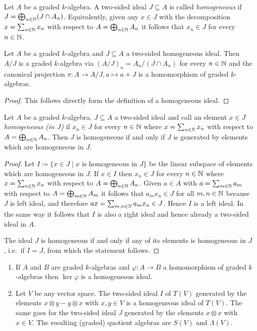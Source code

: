 \begin{defi}
 Let $A$ be a graded $k$-algebra. A two-sided ideal $J \subseteq A$ is called \emph{homogeneous} if $J = \bigoplus_{n \in \mathbb{N}} (J \cap A_n)$. Equivalently, given any $x \in J$ with the decomposition $x = \sum_{n \in \mathbb{N}} x_n$ with respect to $A = \bigoplus_{n \in \mathbb{N}} A_n$ it follows that $x_n \in J$ for every $n \in \mathbb{N}$.
\end{defi}


\begin{lem}
 Let $A$ be a graded $k$-algebra and $J \subseteq A$ a two-sided homogeneous ideal. Then $A/J$ is a graded $k$-algebra via $(A/J)_n = A_n/(J \cap A_n)$ for every $n \in \mathbb{N}$ and the canonical projection $\pi \colon A \to A/J, a \mapsto a + J$ is a homomorphism of graded $k$-algebras.
\end{lem}
\begin{proof}
 This follows directly form the definition of a homogeneous ideal.
\end{proof}


\begin{lem}
 Let $A$ be a graded $k$-algebra, $J \subseteq A$ a two-sided ideal and call an element $x \in J$ \emph{homogeneous (in $J$)} if $x_n \in J$ for every $n \in \mathbb{N}$ where $x = \sum_{n \in \mathbb{N}} x_n$ with respect to $A = \bigoplus_{n \in \mathbb{N}} A_n$. Then $J$ is homogeneous if and only if $J$ is generated by elements which are homogeneous in $J$.
\end{lem}
\begin{proof}
 Let $I \coloneqq \{x \in J \mid \text{$x$ is homogeneous in $J$}\}$ be the linear subspace of elements which are homogeneous in $J$. If $x \in I$ then $x_n \in J$ for every $n \in \mathbb{N}$ where $x = \sum_{n \in \mathbb{N}} x_n$ with respect to $A = \bigoplus_{n \in \mathbb{N}} A_n$. Given $a \in A$ with $a = \sum_{m \in \mathbb{N}} a_m$ with respect to $A = \bigoplus_{m \in \mathbb{N}} A_m$ it follows that $a_m x_n \in J$ for all $m,n \in \mathbb{N}$ because $J$ is left ideal, and therefore $ax = \sum_{m,n \in \mathbb{N}} a_m x_n \in J$. Hence $I$ is a left ideal. In the same way it follows that $I$ is also a right ideal and hence already a two-sided ideal in $A$.
 
 The ideal $J$ is homogeneous if and only if any of its elements is homogeneous in $J$, i.e.\ if $I = J$, from which the statement follows.
\end{proof}


\begin{expls}
 \begin{enumerate}[leftmargin=*]
  \item
   If $A$ and $B$ are graded $k$-algebras and $\varphi \colon A \to B$ a homomorphism of graded $k$-algebras then $\ker \varphi$ is a homogeneous ideal.
  \item
   Let $V$ be any vector space. The two-sided ideal $I$ of $T(V)$ generated by the elements $x \otimes y - y \otimes x$ with $x,y \in V$ is a homogeneous ideal of $T(V)$. The same goes for the two-sided ideal $J$ generated by the elements $x \otimes x$ with $x \in V$. The resulting (graded) quotient algebras are $S(V)$ and $\Lambda(V)$.
 \end{enumerate}
\end{expls}



